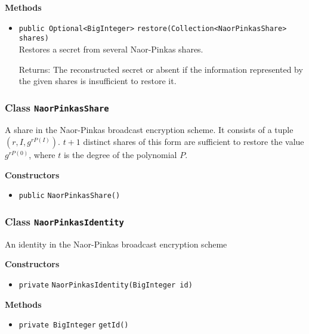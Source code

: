 \textbf{Methods}
\begin{itemize}
\item \lstinline|public Optional<BigInteger>| \lstinline|restore|\lstinline|(Collection<NaorPinkasShare> shares)|\\
Restores a secret from several Naor-Pinkas shares.

Returns: The reconstructed secret or absent if the information represented
 by the given shares is insufficient to restore it.

\end{itemize}

\subsubsection{Class \lstinline|NaorPinkasShare|}
A share in the Naor-Pinkas broadcast encryption scheme. It consists of a tuple
 $(r, I, g^{r P(I)})$. $t + 1$ distinct shares of this form are sufficient to restore the
 value $g^{r P(0)}$, where $t$ is the degree of the polynomial $P$. \\





\textbf{Constructors}
\begin{itemize}
\item \lstinline|public| \lstinline|NaorPinkasShare|\lstinline|()|




\end{itemize}


\subsubsection{Class \lstinline|NaorPinkasIdentity|}
An identity in the Naor-Pinkas broadcast encryption scheme \\





\textbf{Constructors}
\begin{itemize}
\item \lstinline|private| \lstinline|NaorPinkasIdentity|\lstinline|(BigInteger id)|




\end{itemize}


\textbf{Methods}
\begin{itemize}
\item \lstinline|private BigInteger| \lstinline|getId|\lstinline|()|




\end{itemize}


